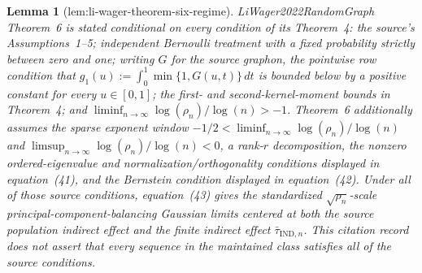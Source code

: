 \documentclass{article}
\newtheorem{lemma}{Lemma}
\begin{document}
\begin{lemma}[lem:li-wager-theorem-six-regime]\label{lem:li-wager-theorem-six-regime}
LiWager2022RandomGraph Theorem~6 is stated conditional on every condition of its Theorem~4: the source's Assumptions~1--5; independent Bernoulli treatment with a fixed probability strictly between zero and one; writing \(G\) for the source graphon, the pointwise row condition that \(g_1(u):=\int_0^1\min\{1,G(u,t)\}\,dt\) is bounded below by a positive constant for every \(u\in[0,1]\); the first- and second-kernel-moment bounds in Theorem~4; and \(\liminf_{n\to\infty}\log(\rho_n)/\log(n)>-1\). Theorem~6 additionally assumes the sparse exponent window \(-1/2<\liminf_{n\to\infty}\log(\rho_n)/\log(n)\) and \(\limsup_{n\to\infty}\log(\rho_n)/\log(n)<0\), a rank-\(r\) decomposition, the nonzero ordered-eigenvalue and normalization/orthogonality conditions displayed in equation~(41), and the Bernstein condition displayed in equation~(42). Under all of those source conditions, equation~(43) gives the standardized \(\sqrt{\rho_n}\)-scale principal-component-balancing Gaussian limits centered at both the source population indirect effect and the finite indirect effect \(\bar\tau_{\mathrm{IND},n}\). This citation record does not assert that every sequence in the maintained class satisfies all of the source conditions.
\end{lemma}
\end{document}
